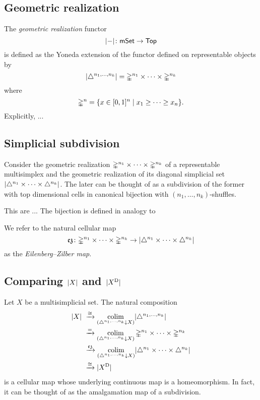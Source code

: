 
\subsection{Geometric realization}

The \textit{geometric realization} functor
\[
\lvert-\rvert \colon \mathsf{mSet} \to \mathsf{Top}
\]
is defined as the Yoneda extension of the functor defined on representable objects by
\[
\lvert\triangle^{n_1, \dots, n_k}\rvert =
\mathbb{\Delta}^{n_1} \times \dots \times \mathbb{\Delta}^{n_k}
\]
where
\[
\mathbb{\Delta}^n = \{x \in [0,1]^n \mid x_1 \geq \dots \geq x_n\}.
\]
Explicitly, ... 

\subsection{Simplicial subdivision}

Consider the geometric realization $\mathbb{\Delta}^{n_1} \times \dots \times \mathbb{\Delta}^{n_k}$ of a representable multisimplex and the geometric realization of its diagonal simplicial set $\lvert\triangle^{n_1} \times \dots \times \triangle^{n_k}\rvert$.
The later can be thought of as a subdivision of the former with top dimensional cells in canonical bijection with $(n_1, \dots, n_k)$-shuffles.

This are ... 
The bijection is defined in analogy to 

We refer to the natural cellular map
\[
\operatorname{\mathfrak{ez}} \colon
\mathbb{\Delta}^{n_1} \times \dots \times \mathbb{\Delta}^{n_k} \to
\lvert\triangle^{n_1} \times \dots \times \triangle^{n_k}\rvert
\]
as the \textit{Eilenberg--Zilber map}.

\subsection{Comparing $\lvert X\rvert$ and $\lvert X^{\operatorname{D}}\rvert$}

Let $X$ be a multisimplicial set.
The natural composition
\begin{equation} \label{e:ez comparison}
\begin{split}
\lvert X\rvert \ &\xrightarrow{\cong}
\operatorname*{colim}_{(\triangle^{n_1, \dots, n_k} \downarrow X)} \lvert\triangle^{n_1, \dots, n_k}\rvert \\ &\xrightarrow{=}
\operatorname*{colim}_{(\triangle^{n_1, \dots, n_k} \downarrow X)} \mathbb{\Delta}^{n_1} \times \dots \times \mathbb{\Delta}^{n_k} \\ &\xrightarrow{\operatorname{\mathfrak{ez}}}
\operatorname*{colim}_{(\triangle^{n_1, \dots, n_k} \downarrow X)} \lvert\triangle^{n_1} \times \dots \times \triangle^{n_k}\rvert \\ &\xrightarrow{\cong}
\lvert X^{\operatorname{D}}\rvert
\end{split}
\end{equation}
is a cellular map whose underlying continuous map is a homeomorphism.
In fact, it can be thought of as the amalgamation map of a subdivision.

